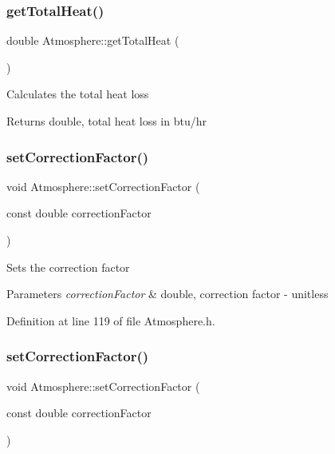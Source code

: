\subsubsection{\texorpdfstring{get\+Total\+Heat()}{getTotalHeat()}\hspace{0.1cm}{\footnotesize\ttfamily [3/3]}}
{\footnotesize\ttfamily double Atmosphere\+::get\+Total\+Heat (\begin{DoxyParamCaption}{ }\end{DoxyParamCaption})}

Calculates the total heat loss \begin{DoxyReturn}{Returns}
double, total heat loss in btu/hr 
\end{DoxyReturn}
\mbox{\label{class_atmosphere_a86fab4b05de35c9a2b1a3a7e5ab70779}} 
\subsubsection{\texorpdfstring{set\+Correction\+Factor()}{setCorrectionFactor()}\hspace{0.1cm}{\footnotesize\ttfamily [1/3]}}
{\footnotesize\ttfamily void Atmosphere\+::set\+Correction\+Factor (\begin{DoxyParamCaption}\item[{const double}]{correction\+Factor }\end{DoxyParamCaption})\hspace{0.3cm}{\ttfamily [inline]}}

Sets the correction factor 
\begin{DoxyParams}{Parameters}
{\em correction\+Factor} & double, correction factor -\/ unitless \\
\hline
\end{DoxyParams}


Definition at line 119 of file Atmosphere.\+h.

\mbox{\label{class_atmosphere_a86fab4b05de35c9a2b1a3a7e5ab70779}} 
\subsubsection{\texorpdfstring{set\+Correction\+Factor()}{setCorrectionFactor()}\hspace{0.1cm}{\footnotesize\ttfamily [2/3]}}
{\footnotesize\ttfamily void Atmosphere\+::set\+Correction\+Factor (\begin{DoxyParamCaption}\item[{const double}]{correction\+Factor }\end{DoxyParamCaption})\hspace{0.3cm}{\ttfamily [inline]}}

